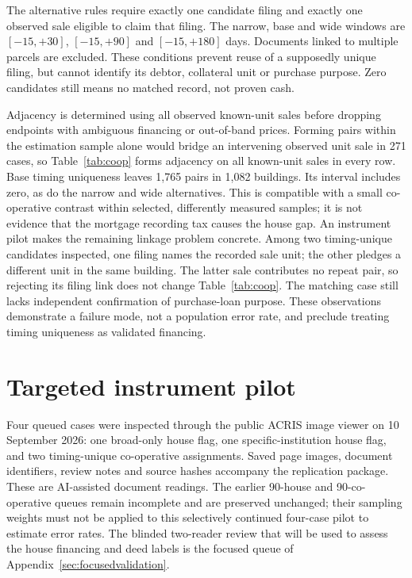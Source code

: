 \documentclass[12pt]{article}
\begin{document}
The alternative rules require exactly one candidate filing and exactly one observed sale eligible to claim that filing. The narrow, base and wide windows are $[-15,+30]$, $[-15,+90]$ and $[-15,+180]$ days. Documents linked to multiple parcels are excluded. These conditions prevent reuse of a supposedly unique filing, but cannot identify its debtor, collateral unit or purchase purpose. Zero candidates still means no matched record, not proven cash.

Adjacency is determined using all observed known-unit sales before dropping endpoints with ambiguous financing or out-of-band prices. Forming pairs within the estimation sample alone would bridge an intervening observed unit sale in 271 cases, so Table~\ref{tab:coop} forms adjacency on all known-unit sales in every row. Base timing uniqueness leaves 1,765 pairs in 1,082 buildings. Its interval includes zero, as do the narrow and wide alternatives. This is compatible with a small co-operative contrast within selected, differently measured samples; it is not evidence that the mortgage recording tax causes the house gap.
An instrument pilot makes the remaining linkage problem concrete. Among two timing-unique candidates inspected, one filing names the recorded sale unit; the other pledges a different unit in the same building. The latter sale contributes no repeat pair, so rejecting its filing link does not change Table~\ref{tab:coop}. The matching case still lacks independent confirmation of purchase-loan purpose. These observations demonstrate a failure mode, not a population error rate, and preclude treating timing uniqueness as validated financing.



\section{Targeted instrument pilot}\label{sec:pilot}
Four queued cases were inspected through the public ACRIS image viewer on 10 September 2026: one broad-only house flag, one specific-institution house flag, and two timing-unique co-operative assignments. Saved page images, document identifiers, review notes and source hashes accompany the replication package. These are AI-assisted document readings. The earlier 90-house and 90-co-operative queues remain incomplete and are preserved unchanged; their sampling weights must not be applied to this selectively continued four-case pilot to estimate error rates. The blinded two-reader review that will be used to assess the house financing and deed labels is the focused queue of Appendix~\ref{sec:focusedvalidation}.
\end{document}
